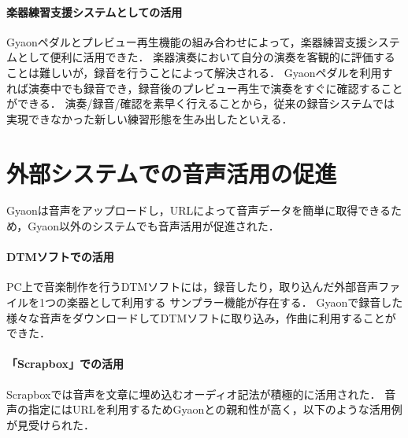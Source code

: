 \paragraph*{楽器練習支援システムとしての活用}
Gyaonペダルとプレビュー再生機能の組み合わせによって，楽器練習支援システムとして便利に活用できた．
楽器演奏において自分の演奏を客観的に評価することは難しいが，録音を行うことによって解決される．
Gyaonペダルを利用すれば演奏中でも録音でき，録音後のプレビュー再生で演奏をすぐに確認することができる．
演奏/録音/確認を素早く行えることから，従来の録音システムでは実現できなかった新しい練習形態を生み出したといえる．



\section{外部システムでの音声活用の促進}
Gyaonは音声をアップロードし，URLによって音声データを簡単に取得できるため，Gyaon以外のシステムでも音声活用が促進された．

\paragraph*{DTMソフトでの活用}
PC上で音楽制作を行うDTMソフトには，録音したり，取り込んだ外部音声ファイルを1つの楽器として利用する
サンプラー機能が存在する．
Gyaonで録音した様々な音声をダウンロードしてDTMソフトに取り込み，作曲に利用することができた．

\paragraph*{「Scrapbox」での活用}
Scrapboxでは音声を文章に埋め込むオーディオ記法が積極的に活用された．
音声の指定にはURLを利用するためGyaonとの親和性が高く，以下のような活用例が見受けられた．

